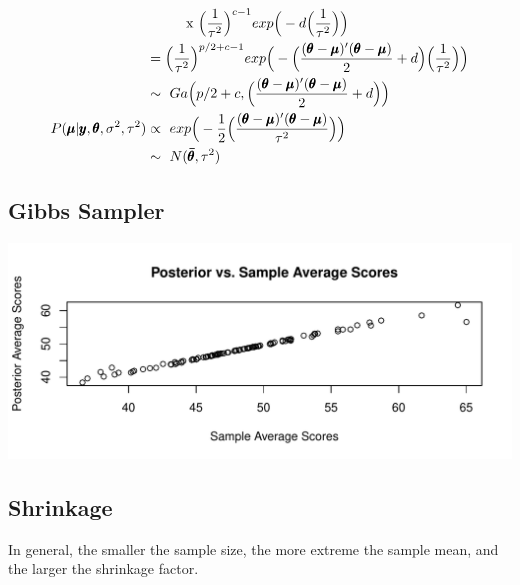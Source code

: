 \documentclass[12pt,letterpaper]{article}\usepackage[]{graphicx}\usepackage[]{color}
\makeatletter
\def\maxwidth{ %
  \ifdim\Gin@nat@width>\linewidth
    \linewidth
  \else
    \Gin@nat@width
  \fi
}
\newenvironment{kframe}{%
 \def\at@end@of@kframe{}%
 \ifinner\ifhmode%
  \def\at@end@of@kframe{\end{minipage}}%
  \begin{minipage}{\columnwidth}%
 \fi\fi%
 \def\FrameCommand##1{\hskip\@totalleftmargin \hskip-\fboxsep
 \colorbox{shadecolor}{##1}\hskip-\fboxsep
     \hskip-\linewidth \hskip-\@totalleftmargin \hskip\columnwidth}%
 \MakeFramed {\advance\hsize-\width
   \@totalleftmargin\z@ \linewidth\hsize
   \@setminipage}}%
 {\par\unskip\endMakeFramed%
 \at@end@of@kframe}
\newenvironment{knitrout}{}{} %
\makeatother
\begin{document}
\begin{align*}
	& \hspace{10mm} \text{x } \Big( \dfrac{1}{\tau^2} \Big) 
			^{c-1} exp \Big( -d \Big( \dfrac{1}{\tau^2} \Big) \Big)\\
	&= \Big( \dfrac{1}{\tau^2} \Big) ^{p/2 + c -1}
		exp \Big( - \Big( \dfrac{(\pmb{\theta}-\pmb{\mu})'
      (\pmb{\theta}-\pmb{\mu})}{2} + d \Big)
			\Big( \frac{1}{\tau^2} \Big) \Big)\\
	&\sim\ Ga \Big( p/2+c, \Big( \dfrac{(\pmb{\theta}-\pmb{\mu})'
    (\pmb{\theta}-\pmb{\mu})}{2} + d \Big) \Big)\\
\vspace{10mm}
P(\pmb{\mu}|\pmb{y},\pmb{\theta}, \sigma^2, \tau^2) 
  &\propto\ exp \Big( -\frac{1}{2} \Big( 
  	\dfrac{(\pmb{\theta}-\pmb{\mu})'(\pmb{\theta}-\pmb{\mu})} {\tau^2}
		\Big) \Big)\\
  &\sim\ N(\pmb{\bar{\theta}}, \tau^2)
\end{align*}


\subsection{Gibbs Sampler}

\begin{knitrout}
\color{fgcolor}
\includegraphics[width=\maxwidth]{figure/unnamed-chunk-2-1} 
\begin{kframe}

{\ttfamily\noindent\bfseries\color{errorcolor}{\#\# Error in eval(expr, envir, enclos): object 'ybars' not found}}\end{kframe}
\end{knitrout}

\subsection{Shrinkage}

In general, the smaller the sample size, the more extreme the sample mean, and the larger the shrinkage factor. 
\end{document}
